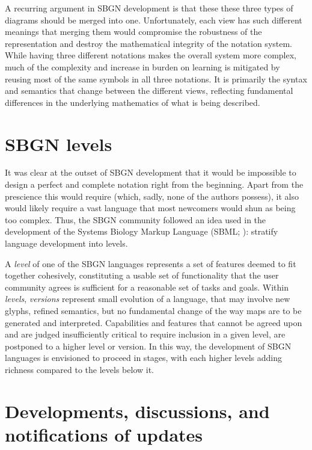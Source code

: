 A recurring argument in SBGN development is that these these three types of diagrams should be merged into one.  Unfortunately, each view has such different meanings that merging them would compromise the robustness of the representation and destroy the mathematical integrity of the notation system.  While having three different notations makes the overall system more complex, much of the complexity and increase in burden on learning is mitigated by reusing most of the same symbols in all three notations.  It is primarily the syntax and semantics that change between the different views, reflecting fundamental differences in the underlying mathematics of what is being described.

\section{SBGN levels}
\label{sec:sbgn-levels}

It was clear at the outset of SBGN development that it would be impossible to design a perfect and complete notation right from the beginning.  Apart from the prescience this would require (which, sadly, none of the authors possess), it also would likely require a vast language that most newcomers would shun as being too complex.  Thus, the SBGN community followed an idea used in the development of the Systems Biology Markup Language (SBML; \cite{Hucka:2003}): stratify language development into levels.

A \emph{level} of one of the SBGN languages represents a set of features deemed to fit together cohesively, constituting a usable set of functionality that the user community agrees is sufficient for a reasonable set of tasks and goals.  Within \emph{levels}, \emph{versions} represent small evolution of a language, that may involve new glyphs, refined semantics, but no fundamental change of the way maps are to be generated and interpreted. Capabilities and features that cannot be agreed upon and are judged insufficiently critical to require inclusion in a given level, are postponed to a higher level or version.  In this way, the development of SBGN languages is envisioned to proceed in stages, with each higher levels adding richness compared to the levels below it.

\section{Developments, discussions, and notifications of updates}
\label{sec:discussions}


